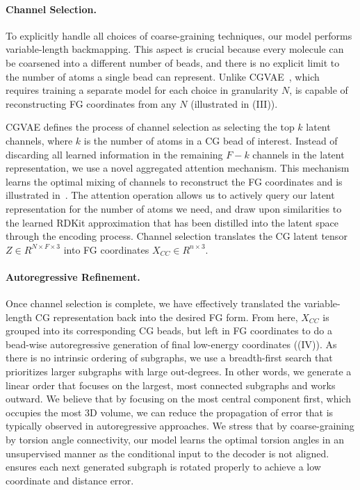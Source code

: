 \paragraph{Channel Selection.} To explicitly handle all choices of coarse-graining techniques, our model performs variable-length backmapping.
This aspect is crucial because every molecule can be coarsened into a different number of beads, and there is no explicit limit to the number of atoms a single bead can represent. Unlike CGVAE~\citep{CGVAE}, which requires training a separate model for each choice in granularity $N$, \model is capable of reconstructing FG coordinates from any $N$ (illustrated in (III)).

CGVAE defines the process of channel selection as selecting the top $k$ latent channels, where $k$ is the number of atoms in a CG bead of interest. Instead of discarding all learned information in the remaining $F-k$ channels in the latent representation, we use a novel aggregated attention mechanism. This mechanism learns the optimal mixing of channels to reconstruct the FG coordinates and is illustrated in~.
The attention operation allows us to actively query our latent representation for the number of atoms we need, and draw upon similarities to the learned RDKit approximation that has been distilled into the latent space through the encoding process.
Channel selection translates the CG latent tensor $Z \in R^{N\times F \times 3}$ into FG coordinates $X_{CC} \in R^{n\times 3}$.

\vspace{-1ex}
\paragraph{Autoregressive Refinement.} Once channel selection is complete, we have effectively translated the variable-length CG representation back into the desired FG form. From here, $X_{CC}$ is grouped into its corresponding CG beads, but left in FG coordinates to do a bead-wise autoregressive generation of final low-energy coordinates ((IV)). 
As there is no intrinsic ordering of subgraphs, we use a breadth-first search that prioritizes larger subgraphs with large out-degrees. In other words, we generate a linear order that focuses on the largest, most connected subgraphs and works outward. We believe that by focusing on the most central component first, which occupies the most 3D volume, we can reduce the propagation of error that is typically observed in autoregressive approaches.
We stress that by coarse-graining by torsion angle connectivity, our model learns the optimal torsion angles in an unsupervised manner as the conditional input to the decoder is not aligned. \model ensures each next generated subgraph is rotated properly to achieve a low coordinate and distance error.

